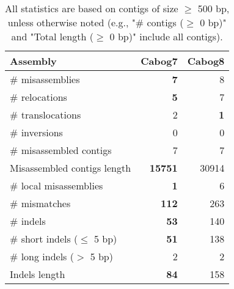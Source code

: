 \documentclass[12pt,a4paper]{article}
\begin{document}
\begin{table}[ht]
\begin{center}
\caption{All statistics are based on contigs of size $\geq$ 500 bp, unless otherwise noted (e.g., "\# contigs ($\geq$ 0 bp)" and "Total length ($\geq$ 0 bp)" include all contigs).}
\begin{tabular}{|l*{2}{|r}|}
\hline
Assembly & Cabog7 & Cabog8 \\ \hline
\# misassemblies & {\bf 7} & 8 \\ \hline
\hspace{5mm}\# relocations & {\bf 5} & 7 \\ \hline
\hspace{5mm}\# translocations & 2 & {\bf 1} \\ \hline
\hspace{5mm}\# inversions & 0 & 0 \\ \hline
\# misassembled contigs & 7 & 7 \\ \hline
Misassembled contigs length & {\bf 15751} & 30914 \\ \hline
\# local misassemblies & {\bf 1} & 6 \\ \hline
\# mismatches & {\bf 112} & 263 \\ \hline
\# indels & {\bf 53} & 140 \\ \hline
\hspace{5mm}\# short indels ($\leq$ 5 bp) & {\bf 51} & 138 \\ \hline
\hspace{5mm}\# long indels ($>$ 5 bp) & 2 & 2 \\ \hline
Indels length & {\bf 84} & 158 \\ \hline
\end{tabular}
\end{center}
\end{table}
\end{document}
